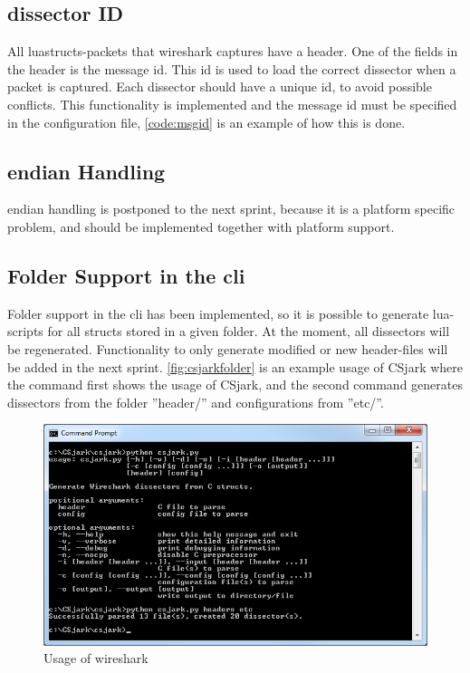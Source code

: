\subsection{\Gls{dissector} ID}
All luastructs-\glspl{packet} that \Gls{wireshark} captures have a \gls{header}. One of the fields in 
the \gls{header} is the message id. This id is used to load the correct 
\gls{dissector} when a \gls{packet} is captured. Each \gls{dissector} should have a unique id, 
to avoid possible conflicts. This functionality is implemented and the 
message id must be specified in the configuration file, \autoref{code:msgid} 
is an example of how this is done.



\subsection{\Gls{endian} Handling}
\Gls{endian} handling is postponed to the next sprint, because it is a platform 
specific problem, and should be implemented together with platform support.

\subsection{Folder Support in the \gls{cli}}
Folder support in the \gls{cli} has been 
implemented, so it is possible to generate \Gls{lua}-\glspl{script} for all \glspl{struct} stored 
in a given folder. At the moment, all \glspl{dissector} will be regenerated. 
Functionality to only generate modified or new \gls{header}-files will be added in 
the next sprint. \autoref{fig:csjarkfolder} is an example usage of CSjark where
the command first shows the usage of CSjark, and the second command 
generates \glspl{dissector} from the folder ''\gls{header}/'' and configurations from ''etc/''.

\begin{figure}[ht]
	\center
	\includegraphics[width=\textwidth]{./sprints/img/csjark_folder}
	\caption{Usage of \Gls{wireshark}\label{fig:csjarkfolder}}
\end{figure}

